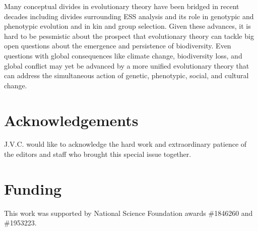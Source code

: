 \documentclass[11pt]{article}
\begin{document}
Many conceptual divides in evolutionary theory have been bridged in recent decades including divides surrounding ESS analysis and its role in genotypic and phenotypic evolution and in kin and group selection. Given these advances, it is hard to be pessmistic about the prospect that evolutionary theory can tackle big open questions about the emergence and persistence of biodiversity. Even questions with global consequences like climate change, biodiversity loss, and global conflict may yet be advanced by a more unified evolutionary theory that can address the simultaneous action of genetic, phenotypic, social, and cultural change.

\section{Acknowledgements}

J.V.C. would like to acknowledge the hard work and extraordinary patience of the editors and staff who brought this special issue together.

\section{Funding}

This work was supported by National Science Foundation awards \#1846260 and \#1953223.

\clearpage
\printbibliography
\end{document}
